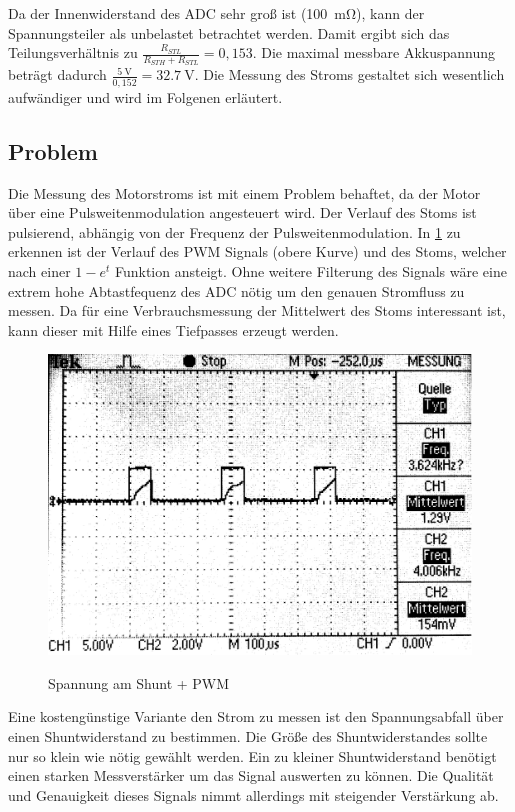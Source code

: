 Da der Innenwiderstand des ADC sehr groß ist (\SI{100}{\mohm}), kann der Spannungsteiler als unbelastet betrachtet werden. Damit ergibt sich das Teilungsverhältnis zu $\frac{R_{STL}}{R_{STH}+R_{STL}}=0,153$.
Die maximal messbare Akkuspannung beträgt dadurch $\frac{\SI{5}{\V}}{0,152}=\SI{32,7}{\V}$. Die Messung des Stroms gestaltet sich wesentlich aufwändiger und wird im Folgenen erläutert.



\subsection{Problem}

Die Messung des Motorstroms ist mit einem Problem behaftet, da der Motor über eine Pulsweitenmodulation angesteuert wird. Der Verlauf des Stoms ist pulsierend, abhängig von
der Frequenz der Pulsweitenmodulation. In \cref{fig:pwm+i_0} zu erkennen ist der Verlauf des PWM Signals (obere Kurve) und des Stoms, welcher nach einer $1-e^t$ Funktion ansteigt.
Ohne weitere Filterung des Signals wäre eine extrem hohe Abtastfequenz des ADC nötig um den genauen Stromfluss zu messen. Da für eine Verbrauchsmessung 
der Mittelwert des Stoms interessant ist, kann dieser mit Hilfe eines Tiefpasses erzeugt werden.


\begin{figure}[H]
\centering
\includegraphics[width=.8\textwidth]{oszi.png}\\
\caption{Spannung am Shunt + PWM}%
\label{fig:pwm+i_0}
\end{figure}

Eine kostengünstige Variante den Strom zu messen ist den Spannungsabfall über einen Shuntwiderstand zu bestimmen. Die Größe des Shuntwiderstandes sollte nur so klein wie nötig gewählt werden.
Ein zu kleiner Shuntwiderstand benötigt einen starken Messverstärker um das Signal auswerten zu können. Die Qualität und Genauigkeit dieses Signals nimmt allerdings mit steigender Verstärkung ab.

